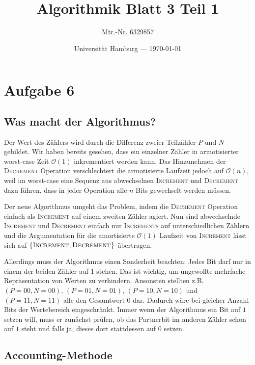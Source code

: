 \documentclass[parskip=half,a4paper]{scrartcl}
\title{Algorithmik Blatt 3 Teil 1}
\author{Mtr.-Nr. 6329857}
\date{Universität Hamburg --- \today}
\begin{document}
\maketitle %

\linenumbers


\section*{Aufgabe 6}

\subsection*{Was macht der Algorithmus?}

Der Wert des Zählers wird durch die Differenz zweier Teilzähler $P$ und $N$ gebildet. Wir haben bereits gesehen, dass ein einzelner Zähler in armotisierter worst-case Zeit $\mathcal{O}(1)$ inkrementiert werden kann. Das Hinzunehmen der \textsc{Decrement} Operation verschlechtert die armotisierte Laufzeit jedoch auf $\mathcal{O}(n)$, weil im worst-case eine Sequenz aus abwechselnen \textsc{Increment} und \textsc{Decrement} dazu führen, dass in jeder Operation alle $n$ Bits gewechselt werden müssen.

Der neue Algorithmus umgeht das Problem, indem die \textsc{Decrement} Operation einfach als \textsc{Increment} auf einem zweiten Zähler agiert. Nun sind abwechselnde \textsc{Increment} und \textsc{Decrement} einfach nur \textsc{Increments} auf unterschiedlichen Zählern und die Argumentation für die amortisierte $\mathcal{O}(1)$ Laufzeit von \textsc{Increment} lässt sich auf $\left\{\textsc{Increment}, \textsc{Decrement}\right\}$ übertragen.

Allerdings muss der Algorithmus einen Sonderheit beachten: Jedes Bit darf nur in einem der beiden Zähler auf 1 stehen. Das ist wichtig, um ungewollte mehrfache Repräsentation von Werten zu verhindern. Ansonsten stellten z.B. $(P=00, N=00)$, $(P=01, N=01)$, $(P=10, N=10)$ und $(P=11, N=11)$ alle den Gesamtwert 0 dar. Dadurch wäre bei gleicher Anzahl Bits der Wertebereich eingeschränkt. Immer wenn der Algorithmus ein Bit auf $1$ setzen will, muss er zunächst prüfen, ob das Partnerbit im anderen Zähler schon auf $1$ steht und falls ja, dieses dort stattdessen auf $0$ setzen.

\subsection*{Accounting-Methode}
\end{document}
